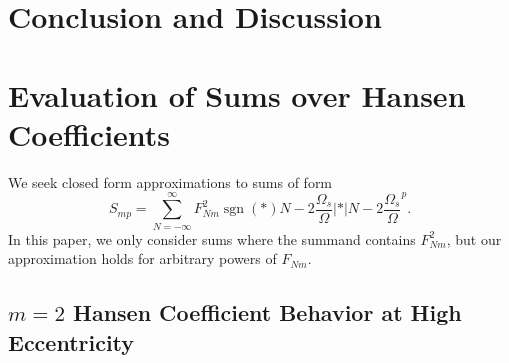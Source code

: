 \documentclass[
        fleqn,
        usenatbib,
        referee,
    ]{mnras}
\newcommand*{\abs}[1]{\left|#1\right|}
\newcommand*{\p}[1]{\left(#1\right)}
\DeclareMathOperator*{\sgn}{sgn}
\begin{document}
\section{Conclusion and Discussion}\label{s:disc}

\appendix

\section{Evaluation of Sums over Hansen Coefficients}\label{app:hansens}

We seek closed form approximations to sums of form
\begin{equation}
    S_{mp} = \sum\limits_{N = -\infty}^\infty
        F_{Nm}^2 \sgn\p*{N - 2\frac{\Omega_s}{\Omega}}
            \abs*{N - 2\frac{\Omega_s}{\Omega}}^p.\label{eq:gen_sum}
\end{equation}
In this paper, we only consider sums where the summand contains $F_{Nm}^2$, but
our approximation holds for arbitrary powers of $F_{Nm}$.

\subsection{$m=2$ Hansen Coefficient Behavior at High Eccentricity}
\end{document}
